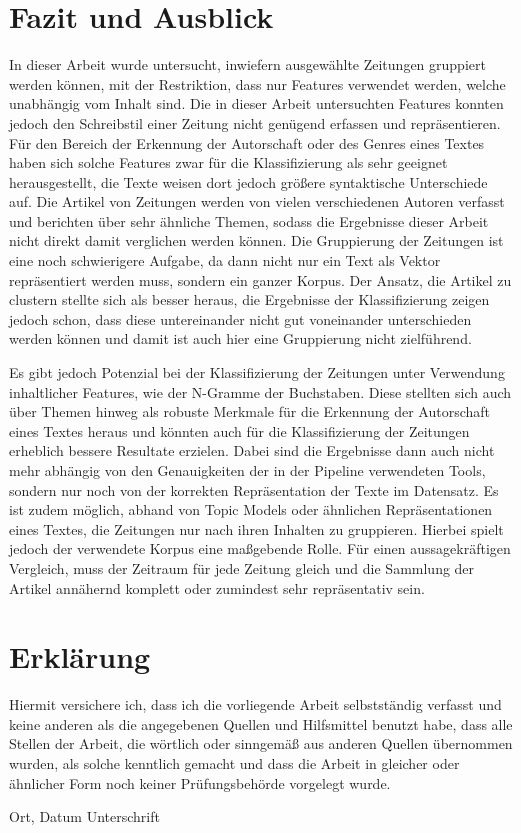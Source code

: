 \chapter{Fazit und Ausblick}
In dieser Arbeit wurde untersucht, inwiefern ausgewählte Zeitungen gruppiert werden können, mit der Restriktion, dass nur Features verwendet werden, welche unabhängig vom Inhalt sind. Die in dieser Arbeit untersuchten Features konnten jedoch den Schreibstil einer Zeitung nicht genügend erfassen und repräsentieren. Für den Bereich der Erkennung der Autorschaft oder des Genres eines Textes haben sich solche Features zwar für die Klassifizierung als sehr geeignet herausgestellt, die Texte weisen dort jedoch größere syntaktische Unterschiede auf. Die Artikel von Zeitungen werden von vielen verschiedenen Autoren verfasst und berichten über sehr ähnliche Themen, sodass die Ergebnisse dieser Arbeit nicht direkt damit verglichen werden können. Die Gruppierung der Zeitungen ist eine noch schwierigere Aufgabe, da dann nicht nur ein Text als Vektor repräsentiert werden muss, sondern ein ganzer Korpus. Der Ansatz, die Artikel zu clustern stellte sich als besser heraus, die Ergebnisse der Klassifizierung zeigen jedoch schon, dass diese untereinander nicht gut voneinander unterschieden werden können und damit ist auch hier eine Gruppierung nicht zielführend.

Es gibt jedoch Potenzial bei der Klassifizierung der Zeitungen unter Verwendung inhaltlicher Features, wie der N-Gramme der Buchstaben. Diese stellten sich auch über Themen hinweg als robuste Merkmale für die Erkennung der Autorschaft eines Textes heraus \cite{stamatatos2013robustness} und könnten auch für die Klassifizierung der Zeitungen erheblich bessere Resultate erzielen. Dabei sind die Ergebnisse  dann auch nicht mehr abhängig von den Genauigkeiten der in der Pipeline verwendeten Tools, sondern nur noch von der korrekten Repräsentation der Texte im Datensatz. Es ist zudem möglich, abhand von Topic Models oder  ähnlichen Repräsentationen eines Textes, die Zeitungen nur nach ihren Inhalten zu gruppieren. Hierbei spielt jedoch der verwendete Korpus eine maßgebende Rolle. Für einen aussagekräftigen Vergleich, muss der Zeitraum für jede Zeitung gleich und die Sammlung der Artikel annähernd komplett oder zumindest sehr repräsentativ sein.




\chapter*{Erklärung}

Hiermit versichere ich, dass ich die vorliegende Arbeit selbstständig verfasst und keine anderen als die angegebenen Quellen und Hilfsmittel benutzt habe, dass alle Stellen der Arbeit, die wörtlich oder sinngemäß aus anderen Quellen übernommen wurden, als solche kenntlich gemacht und dass die Arbeit in gleicher oder ähnlicher Form noch keiner Prüfungsbehörde vorgelegt wurde.

\vspace{3cm}
Ort, Datum \hspace{5cm} Unterschrift\\

